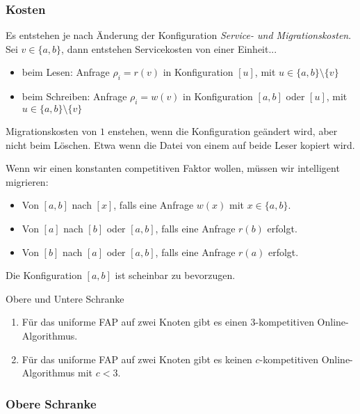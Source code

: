 \documentclass{panikzettel}
\begin{document}
\subsubsection{Kosten}
\label{subsubsec:fap-kosten}
Es entstehen je nach Änderung der Konfiguration \emph{Service- und Migrationskosten}.   \\
Sei $v \in \{a,b\}$, dann entstehen Servicekosten von einer Einheit...
\begin{itemize}
    \item beim Lesen: Anfrage $\rho_i=r(v)$ in Konfiguration $[u]$, mit $u \in \{a,b\} \setminus \{v\}$
    \item beim Schreiben: Anfrage $\rho_i=w(v)$ in Konfiguration $[a,b]$ oder $[u]$, mit $u \in \{a,b\} \setminus \{v\}$
\end{itemize}
Migrationskosten von $1$ enstehen, wenn die Konfiguration geändert wird, aber nicht beim Löschen. Etwa wenn die Datei von einem auf beide Leser kopiert wird.

Wenn wir einen konstanten competitiven Faktor wollen, müssen wir intelligent migrieren:
\begin{itemize}
    \item Von $[a,b]$ nach $[x]$, falls eine Anfrage $w(x)$ mit $x \in \{a,b\}$.
    \item Von $[a]$ nach $[b]$ oder $[a,b]$, falls eine Anfrage $r(b)$ erfolgt.
    \item Von $[b]$ nach $[a]$ oder $[a,b]$, falls eine Anfrage $r(a)$ erfolgt.
\end{itemize}
Die Konfiguration $[a,b]$ ist scheinbar zu bevorzugen.

\begin{theo}{Obere und Untere Schranke}
    \begin{enumerate}
        \item Für das uniforme FAP auf zwei Knoten gibt es einen $3$-kompetitiven Online-Algorithmus.
        \item Für das uniforme FAP auf zwei Knoten gibt es keinen $c$-kompetitiven Online-Algorithmus mit $c < 3$.
    \end{enumerate}
\end{theo}

\subsubsection{Obere Schranke}
\end{document}
